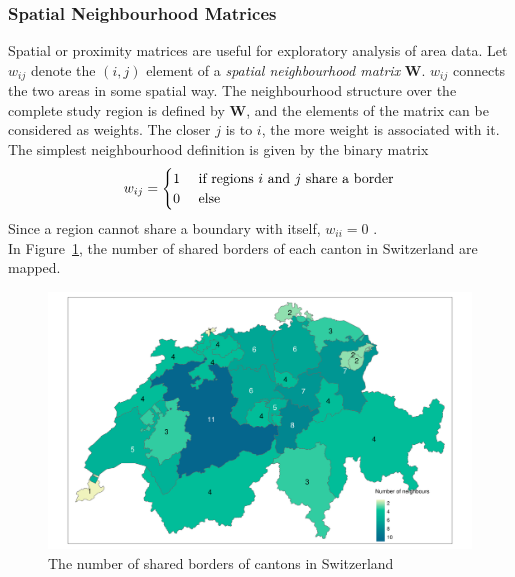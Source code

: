 \subsubsection{Spatial Neighbourhood Matrices}
Spatial or proximity matrices are useful for exploratory analysis of area data. Let $w_{ij}$ denote the $\left(i,j\right)$ element of a \textit{spatial neighbourhood matrix} $\pmb{W}$. $w_{ij}$ connects the two areas in some spatial way. The neighbourhood structure over the complete study region is defined by $\pmb{W}$, and the elements of the matrix can be considered as weights. The closer $j$ is to $i$, the more weight is associated with it. The simplest neighbourhood definition is given by the binary matrix
\begin{equation}
    w_{ij}=\begin{cases}
    1 & \hbox{ if regions } i $\hbox{ and }$ j \hbox{ share a border} \\
    0 & \hbox{ else }
    \end{cases}
\end{equation}
Since a region cannot share a boundary with itself, $w_{ii}=0$  \autocite[][]{moraga2019geospatial}.\\
In Figure~\ref{fig:neighbour}, the number of shared borders of each canton in Switzerland are mapped.
\begin{figure}[H]
   \centering
       \includegraphics[page=1,width=\textwidth]{neighbours.pdf}
 \caption{The number of shared borders of cantons in Switzerland}
 \label{fig:neighbour}
\end{figure}

